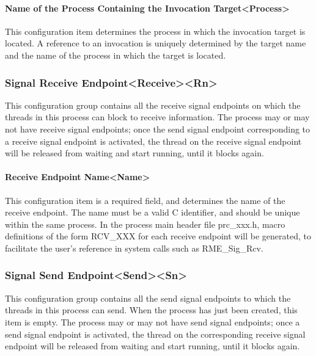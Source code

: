 \paragraph{Name of the Process Containing the Invocation Target<Process>{}}\label{par:5-3-14-18-2}

This configuration item determines the process in which the invocation target is located. A reference to an invocation is uniquely determined by the target name and the name of the process in which the target is located.

\subsubsection{Signal Receive Endpoint<Receive><Rn>{}}\label{subsubsec:5-3-14-19}

This configuration group contains all the receive signal endpoints on which the threads in this process can block to receive information. The process may or may not have receive signal endpoints; once the send signal endpoint corresponding to a receive signal endpoint is activated, the thread on the receive signal endpoint will be released from waiting and start running, until it blocks again.

\paragraph{Receive Endpoint Name<Name>{}}\label{par:5-3-14-19-1}

This configuration item is a required field, and determines the name of the receive endpoint. The name must be a valid C identifier, and should be unique within the same process. In the process main header file prc\_xxx.h, macro definitions of the form RCV\_XXX for each receive endpoint will be generated, to facilitate the user's reference in system calls such as RME\_Sig\_Rcv.

\subsubsection{Signal Send Endpoint<Send><Sn>{}}\label{subsubsec:5-3-14-20}

This configuration group contains all the send signal endpoints to which the threads in this process can send. When the process has just been created, this item is empty. The process may or may not have send signal endpoints; once a send signal endpoint is activated, the thread on the corresponding receive signal endpoint will be released from waiting and start running, until it blocks again.

